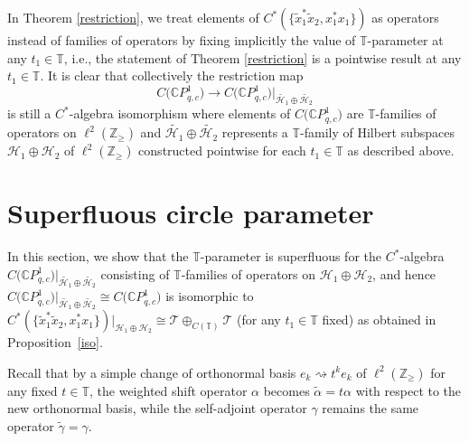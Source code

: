 \documentclass[11pt]{article}
\numberwithin{equation}{section}
\begin{document}
In Theorem \ref{restriction}, we treat elements of $C^{\ast} ( \{ \tilde{x}%
_{1}^{\ast}\tilde{x}_{2},x_{1}^{\ast}x_{1} \} ) $ as operators
instead of families of operators by fixing implicitly the value of
$\mathbb{T}$-parameter at any $t_{1}\in\mathbb{T}$, i.e., the statement of
Theorem \ref{restriction} is a pointwise result at any $t_{1}\in\mathbb{T}$. It is clear that
collectively the restriction map
\[
C\big(\mathbb{C}P_{q,c}^{1}\big) \rightarrow C\big( \mathbb{C}
P_{q,c}^{1}\big) \big|_{\widetilde{\mathcal{H}_{1}}\oplus\widetilde{\mathcal{H}_{2}}}
\]
is still a $C^*$-algebra isomorphism where elements of $C\big( \mathbb{C}P_{q,c}^{1}\big) $ are $\mathbb{T}$-families of operators on $\ell^{2} ( \mathbb{Z}_{\geq} ) $ and $\widetilde{\mathcal{H}_{1}}\oplus\widetilde{\mathcal{H}_{2}}$ represents a $\mathbb{T}$-family of Hilbert subspaces $\mathcal{H}_{1}\oplus\mathcal{H}_{2}$ of $\ell^{2} (\mathbb{Z}_{\geq} ) $ constructed pointwise for each $t_{1}\in \mathbb{T}$ as described above.

\section{Superfluous circle parameter}

In this section, we show that the $\mathbb{T}$-parameter is superfluous for
the $C^*$-algebra $C\big( \mathbb{C}P_{q,c}^{1}\big)
\big|_{\widetilde{\mathcal{H}_{1}}\oplus\widetilde{\mathcal{H}_{2}}}$ consisting
of $\mathbb{T}$-families of operators on $\mathcal{H}_{1}\oplus\mathcal{H}%
_{2}$, and hence $C\big(\mathbb{C}P_{q,c}^{1}\big)
|_{\widetilde{\mathcal{H}_{1}}\oplus\widetilde{\mathcal{H}_{2}}}\cong C\big(
\mathbb{C}P_{q,c}^{1}\big) $ is isomorphic to $C^{\ast} ( \{
\tilde{x}_{1}^{\ast}\tilde{x}_{2},x_{1}^{\ast}x_{1} \} )
|_{\mathcal{H}_{1}\oplus\mathcal{H}_{2}}\cong\mathcal{T}\oplus_{C (
\mathbb{T} ) }\mathcal{T}$ (for any $t_{1}\in\mathbb{T}$ fixed) as
obtained in Proposition~\ref{iso}.

Recall that by a simple change of orthonormal basis $e_{k}\rightsquigarrow
t^{k}e_{k}$ of $\ell^{2} ( \mathbb{Z}_{\geq} ) $ for any fixed
$t\in\mathbb{T}$, the weighted shift operator $\alpha$ becomes $\tilde{\alpha
}=t\alpha$ with respect to the new orthonormal basis, while the self-adjoint
operator $\gamma$ remains the same operator $\tilde{\gamma}=\gamma$.
\end{document}
